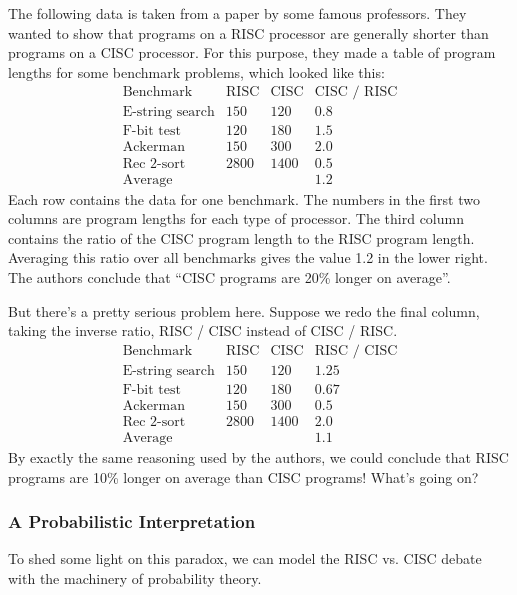 \documentclass[12pt,twoside]{article}
\begin{document}
The following data is taken from a paper by some famous professors.
They wanted to show that programs on a RISC processor are generally
shorter than programs on a CISC processor.  For this purpose, they
made a table of program lengths for some benchmark problems, which
looked like this:
%
\[
\begin{array}{lccc}
\text{Benchmark}	& \text{RISC}	& \text{CISC}	& \text{CISC / RISC}\\
\hline
\text{E-string search}	& 150		& 120		& 0.8 \\
\text{F-bit test}	& 120		& 180		& 1.5 \\
\text{Ackerman}		& 150		& 300		& 2.0 \\
\text{Rec 2-sort}	& 2800		& 1400		& 0.5 \\
\hline
\text{Average}		&		&		& 1.2
\end{array}
\]
%
Each row contains the data for one benchmark.  The numbers in the
first two columns are program lengths for each type of processor.  The
third column contains the ratio of the CISC program length to the RISC
program length.  Averaging this ratio over all benchmarks gives the
value 1.2 in the lower right.  The authors conclude that ``CISC
programs are 20\% longer on average''.

But there's a pretty serious problem here.  Suppose we redo the final
column, taking the inverse ratio, RISC / CISC instead of CISC / RISC.
%
\[
\begin{array}{lccc}
\text{Benchmark}	& \text{RISC}	& \text{CISC}	& \text{RISC / CISC}\\
\hline
\text{E-string search}	& 150		& 120		& 1.25 \\
\text{F-bit test}	& 120		& 180		& 0.67 \\
\text{Ackerman}		& 150		& 300		& 0.5 \\
\text{Rec 2-sort}	& 2800		& 1400		& 2.0 \\
\hline
\text{Average}		&		&		& 1.1
\end{array}
\]
%
By exactly the same reasoning used by the authors, we could conclude
that RISC programs are 10\% longer on average than CISC programs!
What's going on?

\subsubsection{A Probabilistic Interpretation}

To shed some light on this paradox, we can model the RISC vs. CISC
debate with the machinery of probability theory.
\end{document}
